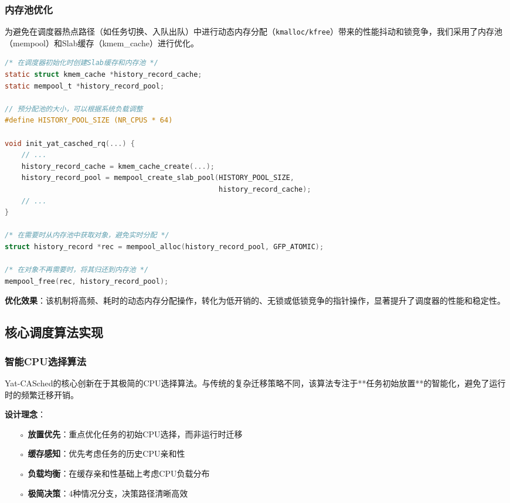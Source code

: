\subsubsection{内存池优化}
为避免在调度器热点路径（如任务切换、入队出队）中进行动态内存分配（\texttt{kmalloc/kfree}）带来的性能抖动和锁竞争，我们采用了内存池（mempool）和Slab缓存（kmem\_cache）进行优化。

\begin{tcolorbox} [
    enhanced, colback=red!5, colframe=red!40!black, leftrule=3mm, rightrule=0mm, toprule=0mm, bottomrule=0mm, arc=2mm, left=5mm, right=5mm, top=3mm, bottom=3mm, fonttitle=\bfseries, title=\textbf{内存池与Slab缓存优化}
]
\begin{lstlisting}[language=C, basicstyle=\footnotesize\ttfamily, showstringspaces=false]
/* 在调度器初始化时创建Slab缓存和内存池 */
static struct kmem_cache *history_record_cache;
static mempool_t *history_record_pool;

// 预分配池的大小，可以根据系统负载调整
#define HISTORY_POOL_SIZE (NR_CPUS * 64)

void init_yat_casched_rq(...) {
    // ...
    history_record_cache = kmem_cache_create(...);
    history_record_pool = mempool_create_slab_pool(HISTORY_POOL_SIZE, 
                                                   history_record_cache);
    // ...
}

/* 在需要时从内存池中获取对象，避免实时分配 */
struct history_record *rec = mempool_alloc(history_record_pool, GFP_ATOMIC);

/* 在对象不再需要时，将其归还到内存池 */
mempool_free(rec, history_record_pool);
\end{lstlisting}
\end{tcolorbox}
\textbf{优化效果}：该机制将高频、耗时的动态内存分配操作，转化为低开销的、无锁或低锁竞争的指针操作，显著提升了调度器的性能和稳定性。

\subsection{核心调度算法实现}

\subsubsection{智能CPU选择算法}

Yat-CASched的核心创新在于其极简的CPU选择算法。与传统的复杂迁移策略不同，该算法专注于**任务初始放置**的智能化，避免了运行时的频繁迁移开销。

\textbf{设计理念}：
\begin{itemize}
    \item[◦] \textbf{放置优先}：重点优化任务的初始CPU选择，而非运行时迁移
    \item[◦] \textbf{缓存感知}：优先考虑任务的历史CPU亲和性
    \item[◦] \textbf{负载均衡}：在缓存亲和性基础上考虑CPU负载分布
    \item[◦] \textbf{极简决策}：4种情况分支，决策路径清晰高效
\end{itemize}

